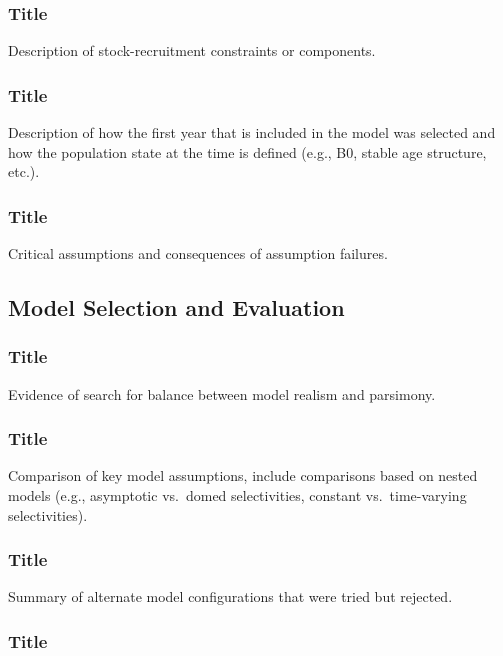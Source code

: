 \documentclass[12pt,]{article}
\begin{document}
\subsubsection{Title}\label{title-11}

Description of stock-recruitment constraints or components.

\subsubsection{Title}\label{title-12}

Description of how the first year that is included in the model was
selected and how the population state at the time is defined (e.g., B0,
stable age structure, etc.).

\subsubsection{Title}\label{title-13}

Critical assumptions and consequences of assumption failures.

\subsection{Model Selection and
Evaluation}\label{model-selection-and-evaluation}

\subsubsection{Title}\label{title-14}

Evidence of search for balance between model realism and parsimony.

\subsubsection{Title}\label{title-15}

Comparison of key model assumptions, include comparisons based on nested
models (e.g., asymptotic vs.~domed selectivities, constant
vs.~time-varying selectivities).

\subsubsection{Title}\label{title-16}

Summary of alternate model configurations that were tried but rejected.

\subsubsection{Title}\label{title-17}
\end{document}
